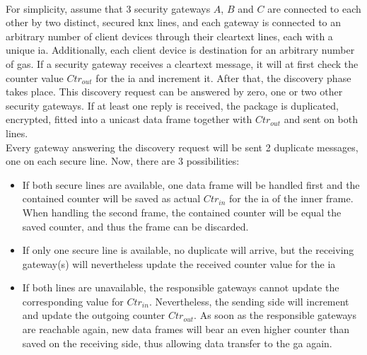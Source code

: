 \\
For simplicity, assume that 3 security gateways $A$, $B$ and $C$ are connected to each other by two distinct, secured \gls{knx} lines, and each gateway is connected
to an arbitrary number of client devices through their cleartext lines, each with a unique \gls{ia}.
Additionally, each client device is destination for an arbitrary number of \glspl{ga}.
If a security gateway receives a cleartext message, it will at first check the counter value $Ctr_{out}$ for the \gls{ia} and increment it. After that, the 
discovery phase takes place. This discovery request can be answered by zero, one or two other security gateways. If at least one reply is received, the package
is duplicated, encrypted, fitted into a unicast data frame together with $Ctr_{out}$ and sent on both lines.
\\
Every gateway answering the discovery request will be sent 2 duplicate messages, one on each secure line. Now, there are 3 possibilities:
\begin{itemize}
 \item If both secure lines are available, one data frame will be handled first and the contained counter will be saved as actual $Ctr_{in}$ for the \gls{ia}
 of the inner frame. When handling the second frame, the contained counter will be equal the saved counter, and thus the frame can be discarded.
 \item If only one secure line is available, no duplicate will arrive, but the receiving gateway(s) will nevertheless update the received counter value for the
 \gls{ia}
 \item If both lines are unavailable, the responsible gateways cannot update the corresponding value for $Ctr_{in}$. Nevertheless, the sending side will 
 increment and update
 the outgoing counter $Ctr_{out}$. As soon as the responsible gateways are reachable again, new data frames will bear an even higher counter than saved on the
 receiving side, thus allowing data transfer to the \gls{ga} again.
\end{itemize}




